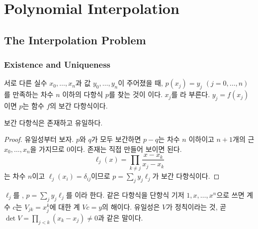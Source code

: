 \chapter{Polynomial Interpolation}
\label{ch:poly-interp}


\section{The Interpolation Problem}
\label{sec:interp-problem}

\subsection{Existence and Uniqueness}

서로 다른 실수 $x_0,\dots,x_n$과 값 $y_0,\dots,y_n$이 주어졌을 때, $p(x_j)=y_j$ $(j=0,\dots,n)$를 만족하는 차수 $n$ 이하의 다항식 $p$를 찾는 것이 이다. $x_j$를 라 부른다. $y_j=f(x_j)$이면 $p$는 함수 $f$의 보간 다항식이다.

\begin{theorem}
\label{thm:interp-unique}
보간 다항식은 존재하고 유일하다.
\end{theorem}

\begin{proof}
유일성부터 보자. $p$와 $q$가 모두 보간하면 $p-q$는 차수 $n$ 이하이고 $n+1$개의 근 $x_0,\dots,x_n$을 가지므로 $0$이다. 존재는 직접 만들어 보이면 된다.
\[
\ell_j(x)=\prod_{k\ne j}\frac{x-x_k}{x_j-x_k}
\]
는 차수 $n$이고 $\ell_j(x_i)=\delta_{ij}$이므로 $p=\sum_jy_j\ell_j$가 보간 다항식이다.
\end{proof}

$\ell_j$를 , $p=\sum_jy_j\ell_j$를 이라 한다. 같은 다항식을 단항식 기저 $1,x,\dots,x^n$으로 쓰면 계수 $c$는  $V_{jk}=x_j^k$에 대한 계 $Vc=y$의 해이다. 유일성은 $V$가 정칙이라는 것, 곧 $\det V=\prod_{j<k}(x_k-x_j)\ne0$과 같은 말이다.

